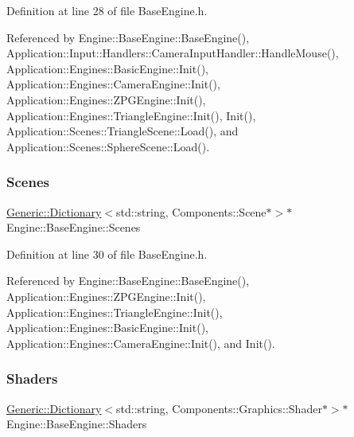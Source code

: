 Definition at line 28 of file Base\+Engine.\+h.



Referenced by Engine\+::\+Base\+Engine\+::\+Base\+Engine(), Application\+::\+Input\+::\+Handlers\+::\+Camera\+Input\+Handler\+::\+Handle\+Mouse(), Application\+::\+Engines\+::\+Basic\+Engine\+::\+Init(), Application\+::\+Engines\+::\+Camera\+Engine\+::\+Init(), Application\+::\+Engines\+::\+Z\+P\+G\+Engine\+::\+Init(), Application\+::\+Engines\+::\+Triangle\+Engine\+::\+Init(), Init(), Application\+::\+Scenes\+::\+Triangle\+Scene\+::\+Load(), and Application\+::\+Scenes\+::\+Sphere\+Scene\+::\+Load().

\mbox{\label{classEngine_1_1BaseEngine_afd02af3c2fbe9bb734db014dec06585a}} 
\subsubsection{\texorpdfstring{Scenes}{Scenes}}
{\footnotesize\ttfamily \mbox{\hyperlink{classGeneric_1_1Dictionary}{Generic\+::\+Dictionary}}$<$std\+::string, Components\+::\+Scene$\ast$$>$$\ast$ Engine\+::\+Base\+Engine\+::\+Scenes\hspace{0.3cm}{\ttfamily [inherited]}}



Definition at line 30 of file Base\+Engine.\+h.



Referenced by Engine\+::\+Base\+Engine\+::\+Base\+Engine(), Application\+::\+Engines\+::\+Z\+P\+G\+Engine\+::\+Init(), Application\+::\+Engines\+::\+Triangle\+Engine\+::\+Init(), Application\+::\+Engines\+::\+Basic\+Engine\+::\+Init(), Application\+::\+Engines\+::\+Camera\+Engine\+::\+Init(), and Init().

\mbox{\label{classEngine_1_1BaseEngine_a2582dee3f73da82bb422b43317b85e3b}} 
\subsubsection{\texorpdfstring{Shaders}{Shaders}}
{\footnotesize\ttfamily \mbox{\hyperlink{classGeneric_1_1Dictionary}{Generic\+::\+Dictionary}}$<$std\+::string, Components\+::\+Graphics\+::\+Shader$\ast$$>$$\ast$ Engine\+::\+Base\+Engine\+::\+Shaders\hspace{0.3cm}{\ttfamily [inherited]}}




